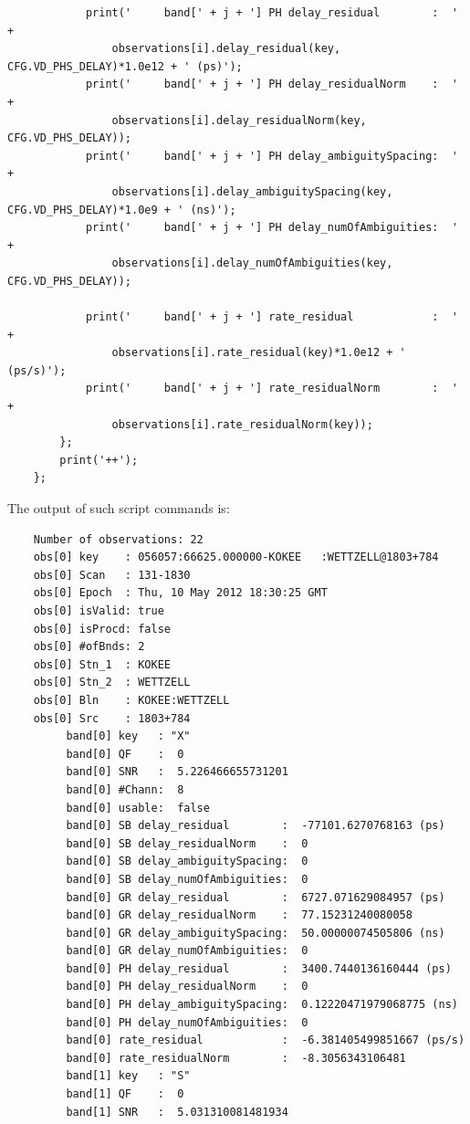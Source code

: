 \documentclass [10pt,letterpaper]{report}
\begin{document}
{{{\begin{verbatim}
            print('     band[' + j + '] PH delay_residual        :  ' +
                observations[i].delay_residual(key, CFG.VD_PHS_DELAY)*1.0e12 + ' (ps)');
            print('     band[' + j + '] PH delay_residualNorm    :  ' +
                observations[i].delay_residualNorm(key, CFG.VD_PHS_DELAY));
            print('     band[' + j + '] PH delay_ambiguitySpacing:  ' +
                observations[i].delay_ambiguitySpacing(key, CFG.VD_PHS_DELAY)*1.0e9 + ' (ns)');
            print('     band[' + j + '] PH delay_numOfAmbiguities:  ' +
                observations[i].delay_numOfAmbiguities(key, CFG.VD_PHS_DELAY));

            print('     band[' + j + '] rate_residual            :  ' +
                observations[i].rate_residual(key)*1.0e12 + ' (ps/s)');
            print('     band[' + j + '] rate_residualNorm        :  ' +
                observations[i].rate_residualNorm(key));
        };
        print('++');
    };
\end{verbatim}}
\noindent
The output of such script commands is:
{\small\begin{verbatim}
    Number of observations: 22
    obs[0] key    : 056057:66625.000000-KOKEE   :WETTZELL@1803+784
    obs[0] Scan   : 131-1830  
    obs[0] Epoch  : Thu, 10 May 2012 18:30:25 GMT
    obs[0] isValid: true
    obs[0] isProcd: false
    obs[0] #ofBnds: 2
    obs[0] Stn_1  : KOKEE
    obs[0] Stn_2  : WETTZELL
    obs[0] Bln    : KOKEE:WETTZELL
    obs[0] Src    : 1803+784
         band[0] key   : "X"
         band[0] QF    :  0
         band[0] SNR   :  5.226466655731201
         band[0] #Chann:  8
         band[0] usable:  false
         band[0] SB delay_residual        :  -77101.6270768163 (ps)
         band[0] SB delay_residualNorm    :  0
         band[0] SB delay_ambiguitySpacing:  0
         band[0] SB delay_numOfAmbiguities:  0
         band[0] GR delay_residual        :  6727.071629084957 (ps)
         band[0] GR delay_residualNorm    :  77.15231240080058
         band[0] GR delay_ambiguitySpacing:  50.00000074505806 (ns)
         band[0] GR delay_numOfAmbiguities:  0
         band[0] PH delay_residual        :  3400.7440136160444 (ps)
         band[0] PH delay_residualNorm    :  0
         band[0] PH delay_ambiguitySpacing:  0.12220471979068775 (ns)
         band[0] PH delay_numOfAmbiguities:  0
         band[0] rate_residual            :  -6.381405499851667 (ps/s)
         band[0] rate_residualNorm        :  -8.3056343106481
         band[1] key   : "S"
         band[1] QF    :  0
         band[1] SNR   :  5.031310081481934

\end{verbatim}}}}
\end{document}
